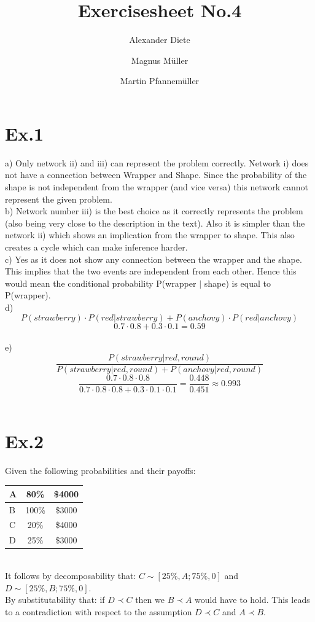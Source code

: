 \documentclass[11pt]{article}
\title{Exercisesheet No.4}
\author{Alexander Diete \and Magnus M\"uller \and Martin Pfannem\"uller}
\begin{document}
\maketitle

\section*{Ex.1}
a) Only network ii) and iii) can represent the problem correctly. Network i) does not have a connection between Wrapper and Shape. Since the probability of the shape is not independent from the wrapper (and vice versa) this network cannot represent the given problem. \\

b) Network number iii) is the best choice as it correctly represents the problem (also being very close to the description in the text). Also it is simpler than the network ii) which shows an implication from the wrapper to shape. This also creates a cycle which can make inference harder.  \\

c) Yes as it does not show any connection between the wrapper and the shape. This implies that the two events are independent from each other. Hence this would mean the conditional probability P(wrapper $|$ shape) is equal to P(wrapper). \\

d) 
$$P(strawberry) \cdot P(red|strawberry) + P(anchovy) \cdot P(red|anchovy)$$
$$0.7 \cdot 0.8 + 0.3 \cdot 0.1 = 0.59$$ \\

e)
$$\frac{P(strawberry | red, round)}{P(strawberry | red, round) + P(anchovy | red, round)}$$
$$\frac{0.7 \cdot 0.8 \cdot 0.8}{0.7 \cdot 0.8 \cdot 0.8 + 0.3 \cdot 0.1 \cdot 0.1} = \frac{0.448}{0.451} \approx 0.993$$ \\

\section*{Ex.2}
Given the following probabilities and their payoffs:\\
\begin{tabular}{|l|c|c|}
\hline
    A & 80\% & \$4000 \\
    \hline
    B & 100\% & \$3000 \\
    \hline
    C & 20\% & \$4000 \\
    \hline
    D & 25\% & \$3000 \\
    \hline
\end{tabular}
\\
It follows by decomposability that: $C\sim[25\%,A; 75\%,0]$ and $D\sim[25\%,B;75\%,0]$. \\
By substitutability that: if $D \prec C$ then we $B \prec A$ would have to hold. This leads to a contradiction with respect to the assumption $D \prec C$ and $A \prec B$.
\end{document}
